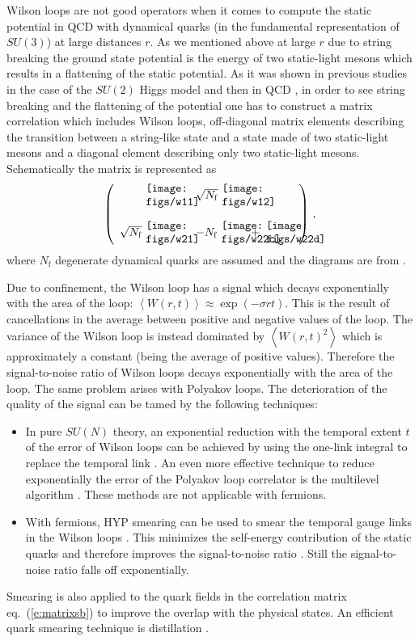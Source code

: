 \documentclass{PoS}
\newcommand{\eq}[1]{eq.~(\ref{#1})}
\newcommand{\ev}[1]{\left\langle #1 \right\rangle}
\newcommand{\SU}[1]{SU(#1)}
\def\nf{N_{\mathrm{f}}}
\newcommand{\www}{\mbox{
\begin{minipage}{24pt}\texttt{[image: figs/w11]}\end{minipage}}}
\newcommand{\wbbc}{\mbox{
\begin{minipage}{24pt}\texttt{[image: figs/w22c]}\end{minipage}}}
\newcommand{\wbbd}{\mbox{
\begin{minipage}{24pt}\texttt{[image: figs/w22d]}\end{minipage}}}
\newcommand{\wwb}{\mbox{
\begin{minipage}{24pt}\texttt{[image: figs/w12]}\end{minipage}}}
\newcommand{\wbw}{\mbox{
\begin{minipage}{24pt}\texttt{[image: figs/w21]}\end{minipage}}}
\begin{document}
Wilson loops are not good operators when it comes to compute the
static potential in QCD with dynamical quarks (in the fundamental
representation of $\SU{3}$) at large distances $r$. As we mentioned above 
at large $r$
due to string breaking the ground state potential is the energy of
two static-light mesons which results in a flattening of the static potential.
As it was shown in previous studies in the case of the $\SU{2}$ Higgs
model \cite{Knechtli:1998gf,Knechtli:2000df,Philipsen:1998de}
and then in QCD \cite{Bali:2005fu},
in order to see string breaking and the flattening of the potential one has
to construct a matrix correlation which includes Wilson loops, off-diagonal
matrix elements describing the transition between a
string-like state and a state made of two static-light mesons and
a diagonal element describing only two static-light mesons.
Schematically the matrix is represented as
\begin{equation}\label{e:matrixsb}
\left(\begin{array}{rl}
\quad \www&\quad \sqrt{\nf}\wwb\\&\\
\sqrt{\nf}\wbw&\quad -\nf\wbbc+\wbbd\end{array}\right) \,,
\end{equation}
where $\nf$ degenerate dynamical quarks are assumed and 
the diagrams are from \cite{Bali:2005fu}.

Due to confinement, the Wilson loop has a signal which decays exponentially
with the area of the loop:
$\ev{W(r,t)} \approx \exp(-\sigma r t)$. This is the result of cancellations
in the average between positive and negative values of the loop.
The variance of the Wilson loop is instead dominated by
$\ev{W(r,t)^2}$ which is approximately a constant (being the average of
positive values). Therefore
the signal-to-noise ratio of Wilson loops decays exponentially with the area
of the loop. The same problem arises with Polyakov loops.
The deterioration of the quality of the signal can be
tamed by the following techniques:
\begin{itemize}
\item
In pure $\SU{N}$ theory, an exponential reduction 
with the temporal extent $t$ of the error of Wilson loops 
can be achieved by using the
one-link integral to replace the temporal link \cite{Parisi:1983hm}.
An even more effective technique to reduce exponentially the error
of the Polyakov loop correlator
is the multilevel algorithm \cite{Luscher:2001up}. 
These methods are not applicable with fermions.
\item
With fermions, HYP smearing \cite{Hasenfratz:2001hp} can be used to smear
the temporal gauge links in the Wilson loops \cite{Donnellan:2010mx}.
This minimizes the self-energy contribution of the static quarks and
therefore improves the signal-to-noise ratio \cite{DellaMorte:2005nwx}.
Still the signal-to-noise ratio falls off exponentially.
\end{itemize}
Smearing is also applied to the quark fields in the correlation matrix
\eq{e:matrixsb} to improve the overlap with the physical states.
An efficient quark smearing technique is distillation \cite{Peardon:2009gh}.
\end{document}
